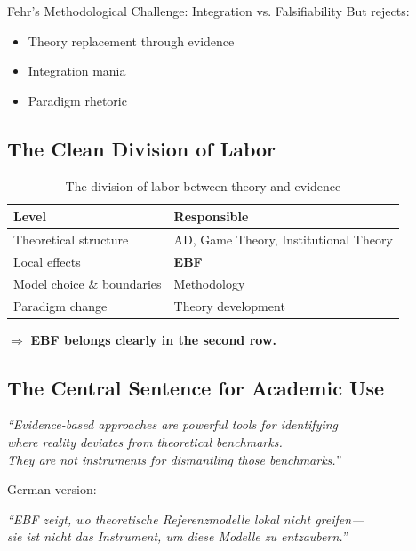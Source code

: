 \begin{chapter}{Fehr's Methodological Challenge: Integration vs. Falsifiability}
But rejects:
\begin{itemize}[noitemsep]
    \item Theory replacement through evidence
    \item Integration mania
    \item Paradigm rhetoric
\end{itemize}

\subsection{The Clean Division of Labor}

\begin{table}[h!]
\centering
\renewcommand{\arraystretch}{1.4}
\begin{tabular}{ll}
\toprule
\textbf{Level} & \textbf{Responsible} \\
\midrule
Theoretical structure & AD, Game Theory, Institutional Theory \\
Local effects & \textbf{EBF} \\
Model choice \& boundaries & Methodology \\
Paradigm change & Theory development \\
\bottomrule
\end{tabular}
\caption{The division of labor between theory and evidence}
\end{table}

$\Rightarrow$ \textbf{EBF belongs clearly in the second row.}

\subsection{The Central Sentence for Academic Use}

\begin{tcolorbox}[colback=green!5!white,colframe=green!75!black]
\begin{center}
\textit{``Evidence-based approaches are powerful tools for identifying\\
where reality deviates from theoretical benchmarks.\\
They are not instruments for dismantling those benchmarks.''}
\end{center}
\end{tcolorbox}

German version:

\begin{tcolorbox}[colback=blue!5!white,colframe=blue!75!black]
\begin{center}
\textit{``EBF zeigt, wo theoretische Referenzmodelle lokal nicht greifen---\\
sie ist nicht das Instrument, um diese Modelle zu entzaubern.''}
\end{center}
\end{tcolorbox}


\end{chapter}
